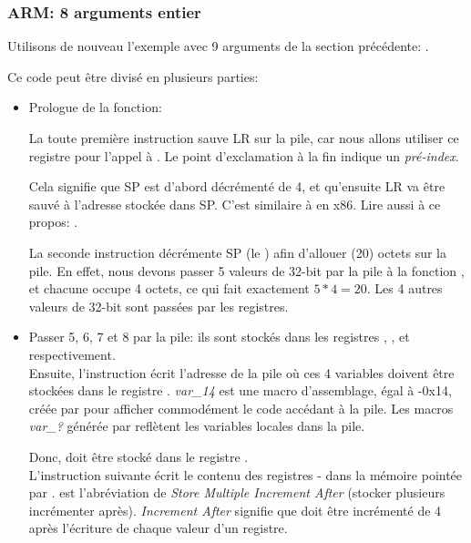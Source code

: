 \subsubsection{ARM: 8 arguments entier}

Utilisons de nouveau l'exemple avec 9 arguments de la section précédente: .



\myparagraph{\OptimizingKeilVI: \ARMMode}



Ce code peut être divisé en plusieurs parties:

\begin{itemize}
\item Prologue de la fonction:

La toute première instruction  sauve \ac{LR} sur la pile,
car nous allons utiliser ce registre pour l'appel à \printf.
Le point d'exclamation à la fin indique un \emph{pré-index}.

Cela signifie que \ac{SP} est d'abord décrémenté de 4, et qu'ensuite \ac{LR}
va être sauvé à l'adresse stockée dans \ac{SP}.
C'est similaire à \PUSH en x86.
Lire aussi à ce propos: .

La seconde instruction  décrémente \ac{SP} (le )
afin d'allouer  (20) octets sur la pile.
En effet, nous devons passer 5 valeurs de 32-bit par la pile à la fonction \printf,
et chacune occupe 4 octets, ce qui fait exactement $5*4=20$.
Les 4 autres valeurs de 32-bit sont passées par les registres.

\item Passer 5, 6, 7 et 8 par la pile: ils sont stockés dans les registres ,
,  et  respectivement.\\
Ensuite, l'instruction  écrit l'adresse de la pile
où ces 4 variables doivent être stockées dans le registre .
\emph{var\_14} est une macro d'assemblage, égal à -0x14, créée par \IDA pour afficher
commodément le code accédant à la pile.
Les macros \emph{var\_?} générée par \IDA reflètent les variables locales dans la pile.

Donc,  doit être stocké dans le registre . \\
L'instruction suivante  écrit le contenu des registres
- dans la mémoire pointée par .
 est l'abréviation de \emph{Store Multiple Increment After} (stocker plusieurs incrémenter après).
\emph{Increment After} signifie que  doit être incrémenté de 4 après
l'écriture de chaque valeur d'un registre.


\end{itemize}
